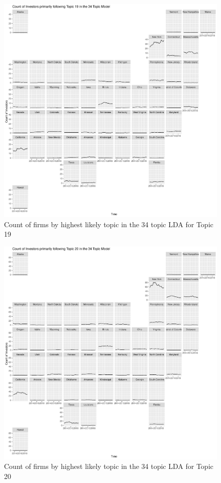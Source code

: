 		\begin{figure}
		\centering
		\includegraphics[width=1\linewidth]{Figures/ChapterV/USA_34_Topic19.pdf}
		\caption[Count of Firms for Topic 19 by Quarter]{Count of firms by highest likely topic in the 34 topic LDA for Topic 19}
		\label{fig:StateLDA20}
	\end{figure}
	
		\begin{figure}
		\centering
		\includegraphics[width=1\linewidth]{Figures/ChapterV/USA_34_Topic20.pdf}
		\caption[Count of Firms for Topic 20 by Quarter]{Count of firms by highest likely topic in the 34 topic LDA for Topic 20}
		\label{fig:StateLDA20}
	\end{figure}
	
